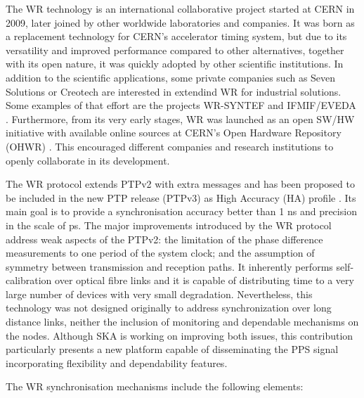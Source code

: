 The WR technology \cite{Wlostowski2011} is an international collaborative
project started at CERN in 2009, later joined by other worldwide laboratories and companies. It was born as a replacement technology for CERN's accelerator timing system, but due to its versatility and improved performance compared to other alternatives, together with its open nature, it was quickly adopted by other scientific institutions. In addition to the scientific applications, some private companies such as Seven Solutions or Creotech are interested in extendind WR for industrial solutions. Some examples of that effort are the projects WR-SYNTEF \cite{web:creotech_projects} and IFMIF/EVEDA \cite{web:seven_projects}. 
Furthermore, from its very early stages, WR was launched as an open SW/HW initiative with available online sources at CERN's Open Hardware Repository (OHWR) \cite{ohwr:repo}. This encouraged different companies and research institutions to openly collaborate in its development.

The WR protocol extends PTPv2 with extra messages and has been proposed to be
included in the new PTP release (PTPv3) as High Accuracy (HA) profile
\cite{wr:maciej-ptpv3-standard} . Its main goal is to provide a synchronisation
accuracy better than 1 ns and precision in the scale of ps. The major
improvements introduced by the WR protocol address weak aspects of the PTPv2:
the limitation of the phase difference measurements to one period of the system
clock; and the assumption of symmetry between transmission and reception
paths. It inherently performs self-calibration over optical fibre links and it
is capable of distributing time to a very large number of devices with very
small degradation. Nevertheless, this technology was not designed originally
to address synchronization over long distance links, neither the inclusion of monitoring and dependable mechanisms on the nodes. Although SKA is working on improving both issues, this contribution particularly presents a new platform capable of disseminating the PPS signal incorporating flexibility and dependability features. 

The WR synchronisation mechanisms include the following elements:

